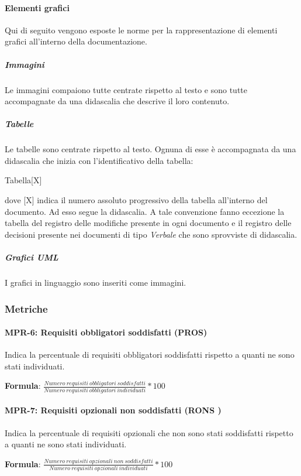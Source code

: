 \paragraph{Elementi grafici}
Qui di seguito vengono esposte le norme per la rappresentazione di elementi grafici all'interno della documentazione.

\subparagraph{Immagini}
Le immagini compaiono tutte centrate rispetto al testo e sono tutte accompagnate da una didascalia che descrive il loro contenuto.

\subparagraph{Tabelle}
Le tabelle sono centrate rispetto al testo. Ognuna di esse è accompagnata da una didascalia che inizia con l'identificativo della tabella:
\begin{center}
    Tabella[X]
\end{center}
dove [X] indica il numero assoluto progressivo della tabella all'interno del documento. Ad esso segue la  didascalia.  A tale convenzione fanno eccezione la tabella del registro delle modifiche presente in ogni documento e il registro delle decisioni presente nei documenti di tipo \textit{Verbale} che sono sprovviste di didascalia.

\subparagraph{Grafici UML}
I grafici in linguaggio  sono inseriti come immagini.


\subsubsection{Metriche}

\paragraph{MPR-6: Requisiti obbligatori soddisfatti (PROS)}\label{_MPR-6}
Indica la percentuale di requisiti obbligatori soddisfatti rispetto a quanti ne sono stati individuati.
\begin{center}
    \item \textbf{Formula}: \(\frac{Numero\ requisiti\ obbligatori\ soddisfatti}{Numero\ requisiti\  obbligatori\ individuati}*100\)
\end{center}

\paragraph{MPR-7: Requisiti opzionali non  soddisfatti (RONS )} \label{_MPR-7}
Indica la percentuale di requisiti opzionali che non sono stati soddisfatti rispetto a quanti ne sono stati individuati.
\begin{center}
    \item \textbf{Formula}: \(\frac{Numero\ requisiti\ opzionali\ non\ soddisfatti}{Numero\ requisiti\  opzionali\ individuati}*100\)
\end{center}

